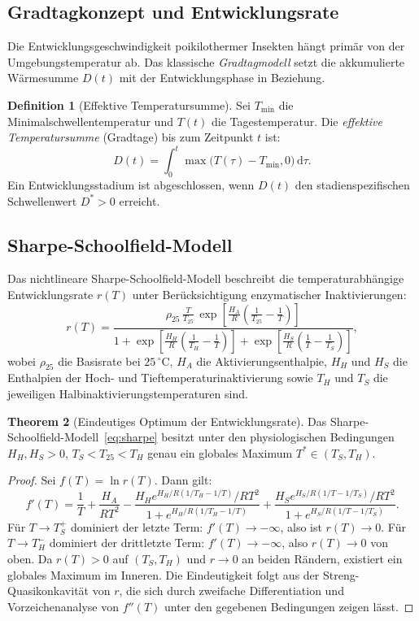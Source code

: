 ﻿\documentclass[12pt, a4paper]{article}
\theoremstyle{definition}
\newtheorem{theorem}{Theorem}[section]
\newtheorem{definition}[theorem]{Definition}
\newcommand{\dd}{\mathrm{d}}
\begin{document}
\subsection{Gradtagkonzept und Entwicklungsrate}

Die Entwicklungsgeschwindigkeit poikilothermer Insekten hängt primär von der
Umgebungstemperatur ab. Das klassische \emph{Gradtagmodell} setzt die
akkumulierte Wärmesumme $D(t)$ mit der Entwicklungsphase in Beziehung.

\begin{definition}[Effektive Temperatursumme]\label{def:gradtag}
Sei $T_{\min}$ die Minimalschwellentemperatur und $T(t)$ die Tagestemperatur.
Die \emph{effektive Temperatursumme} (Gradtage) bis zum Zeitpunkt $t$ ist:
\[
  D(t) = \int_0^t \max\!\bigl(T(\tau) - T_{\min}, 0\bigr)\,\dd\tau.
\]
Ein Entwicklungsstadium ist abgeschlossen, wenn $D(t)$ den stadienspe\-zifischen
Schwellenwert $D^* > 0$ erreicht.
\end{definition}

\subsection{Sharpe-Schoolfield-Modell}

Das nichtlineare Sharpe-Schoolfield-Modell beschreibt die temperaturabhängige
Entwicklungsrate $r(T)$ unter Berücksichtigung enzymatischer Inaktivierungen:
\begin{equation}\label{eq:sharpe}
  r(T) = \frac{\rho_{25}\,\frac{T}{T_{25}}\,\exp\!\!\left[\frac{H_A}{R}\!\left(\frac{1}{T_{25}}-\frac{1}{T}\right)\right]}
  {1 + \exp\!\!\left[\frac{H_H}{R}\!\left(\frac{1}{T_H}-\frac{1}{T}\right)\right]
   + \exp\!\!\left[\frac{H_S}{R}\!\left(\frac{1}{T}-\frac{1}{T_S}\right)\right]},
\end{equation}
wobei $\rho_{25}$ die Basisrate bei $25\,^\circ$C, $H_A$ die Aktivierungsenthalpie, $H_H$
und $H_S$ die Enthalpien der Hoch- und Tieftemperaturinaktivierung sowie $T_H$
und $T_S$ die jeweiligen Halbinaktivierungstemperaturen sind.

\begin{theorem}[Eindeutiges Optimum der Entwicklungsrate]\label{thm:optimum}
Das Sharpe-Schoolfield-Modell~\eqref{eq:sharpe} besitzt unter den physiologischen
Bedingungen $H_H, H_S > 0$, $T_S < T_{25} < T_H$ genau ein globales Maximum
$T^* \in (T_S, T_H)$.
\end{theorem}

\begin{proof}
Sei $f(T) = \ln r(T)$. Dann gilt:
\[
  f'(T) = \frac{1}{T} + \frac{H_A}{RT^2} - \frac{H_H e^{H_H/R(1/T_H - 1/T)}/RT^2}
  {1 + e^{H_H/R(1/T_H-1/T)}} + \frac{H_S e^{H_S/R(1/T-1/T_S)}/RT^2}
  {1 + e^{H_S/R(1/T-1/T_S)}}.
\]
Für $T \to T_S^+$ dominiert der letzte Term: $f'(T) \to -\infty$, also ist
$r(T) \to 0$. Für $T \to T_H^-$ dominiert der drittletzte Term: $f'(T) \to -\infty$,
also $r(T) \to 0$ von oben. Da $r(T) > 0$ auf $(T_S, T_H)$ und $r \to 0$ an
beiden Rändern, existiert ein globales Maximum im Inneren. Die Eindeutigkeit
folgt aus der Streng-Quasikonkavität von $r$, die sich durch zweifache Differentiation
und Vorzeichenanalyse von $f''(T)$ unter den gegebenen Bedingungen zeigen
lässt. \hfill
\end{proof}
\end{document}
